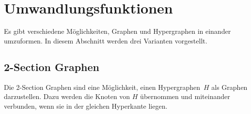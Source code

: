%
%
%    
%
%
%


\section{Umwandlungsfunktionen}
Es gibt verschiedene Möglichkeiten, Graphen und Hypergraphen in einander umzuformen. In diesem Abschnitt werden drei Varianten vorgestellt. 

\subsection{2-Section Graphen}
Die 2-Section Graphen sind eine Möglichkeit, einen Hypergraphen~$H$ als Graphen darzustellen. Dazu werden die Knoten von $H$ übernommen und miteinander verbunden, wenn sie in der gleichen Hyperkante liegen.

